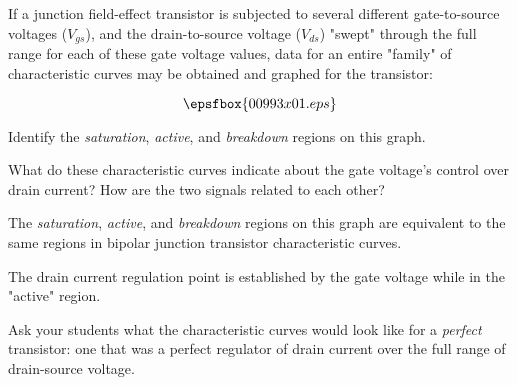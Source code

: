 

If a junction field-effect transistor is subjected to several different gate-to-source voltages ($V_{gs}$), and the drain-to-source voltage ($V_{ds}$) "swept" through the full range for each of these gate voltage values, data for an entire "family" of characteristic curves may be obtained and graphed for the transistor:

$$\epsfbox{00993x01.eps}$$

Identify the {\it saturation}, {\it active}, and {\it breakdown} regions on this graph.

\vskip 10pt

What do these characteristic curves indicate about the gate voltage's control over drain current?  How are the two signals related to each other?







The {\it saturation}, {\it active}, and {\it breakdown} regions on this graph are equivalent to the same regions in bipolar junction transistor characteristic curves.

\vskip 10pt

The drain current regulation point is established by the gate voltage while in the "active" region.







Ask your students what the characteristic curves would look like for a {\it perfect} transistor: one that was a perfect regulator of drain current over the full range of drain-source voltage.




